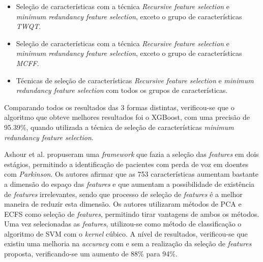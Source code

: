 \documentclass[12pt,a4paper,twoside]{report}
\begin{document}
{\begin{itemize} 
\itemsep-0.5em 
    \item Seleção de características com a técnica \textit{Recursive feature selection} e \textit{minimum redundancy feature selection}, exceto o grupo de características \textit{TWQT}.
    \item Seleção de características com a técnica \textit{Recursive feature selection} e \textit{minimum redundancy feature selection}, exceto o grupo de características \textit{MCFF}. 
    \item Técnicas de seleção de características \textit{Recursive feature selection} e \textit{minimum redundancy feature selection} com todos os grupos de características.
\end{itemize}

Comparando todos os resultados das 3 formas distintas, verificou-se que o algoritmo que obteve melhores resultados foi o \gls{XGBoost}, com uma precisão de 95.39\%, quando utilizada a técnica de seleção
de características \textit{minimum redundancy feature selection}.

Ashour et al. \cite{9072452} propuseram uma \textit{framework} que fazia a seleção das \textit{features} em dois estágios, permitindo a identificação de pacientes com perda de voz em doentes com \textit{Parkinson}. Os autores afirmar que as 753 características aumentam bastante a dimensão do espaço das \textit{features} e que aumentam a possibilidade de existência de \textit{features} irrelevantes, sendo que processo de seleção de \textit{features} é a melhor maneira de reduzir esta dimensão. Os autores utilizaram métodos de \gls{PCA} e \gls{ECFS} como seleção de \textit{features}, permitindo tirar vantagens de ambos os métodos. Uma vez selecionadas as \textit{features}, utilizou-se como método de classificação o algoritmo de \gls{SVM} com o \textit{kernel} cúbico. A nível de resultados, verificou-se que existiu uma melhoria na \textit{accuracy} com e sem a realização da seleção de \textit{features} proposta, verificando-se um aumento de 88\% para 94\%.

}
\end{document}
